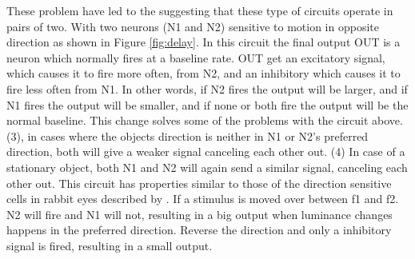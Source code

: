 \documentclass[11pt,a4paper,oneside,table,xcdraw]{article}
\begin{document}
These problem have led to the suggesting that these type of circuits operate in pairs of two. With two neurons (N1 and N2) sensitive to motion in opposite direction as shown in Figure \ref{fig:delay}. In this circuit the final output OUT is a neuron which normally fires at a baseline rate. OUT get an excitatory signal, which causes it to fire more often, from N2, and an inhibitory which causes it to fire less often from N1. In other words, if N2 fires the output will be larger, and if N1 fires the output will be smaller, and if none or both fire the output will be the normal baseline. This change solves some of the problems with the circuit above. (3), in cases where the objects direction is neither in N1 or N2's preferred direction, both will give a weaker signal canceling each other out. (4) In case of a stationary object, both N1 and N2 will again send a similar signal, canceling each other out. This circuit has properties similar to those of the direction sensitive cells in rabbit eyes described by \cite{Barlow1965}. If a stimulus is moved over between f1 and f2. N2 will fire and N1 will not, resulting in a big output when luminance changes happens in the preferred direction. Reverse the direction and only a inhibitory signal is fired, resulting in a small output.
\end{document}
